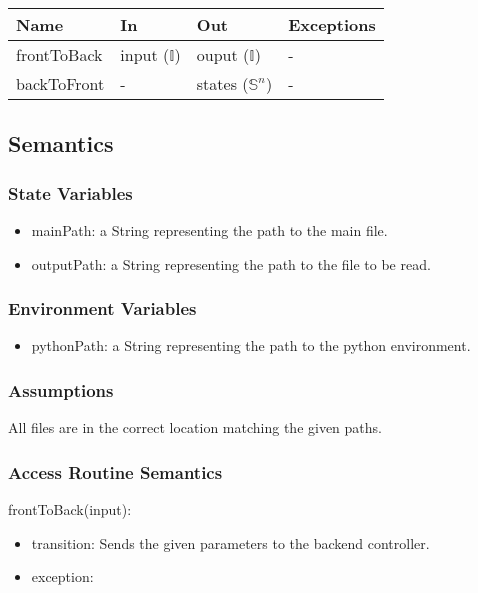 \documentclass[12pt, titlepage]{article}
\begin{document}
\begin{center}
\begin{tabular}{p{2cm} p{4cm} p{4cm} p{2cm}}
\hline
\textbf{Name} & \textbf{In} & \textbf{Out} & \textbf{Exceptions} \\
\hline
frontToBack & input ($\mathbb{I}$) & ouput ($\mathbb{I}$) & - \\
backToFront & - & states ($\mathbb{S}^n$) & - \\
\hline
\end{tabular}
\end{center}

\subsection{Semantics}

\subsubsection{State Variables}

\begin{itemize}
  \item mainPath: a String representing the path to the main file.
  \item outputPath: a String representing the path to the file to be read.
\end{itemize}

\subsubsection{Environment Variables}

\begin{itemize}
  \item pythonPath: a String representing the path to the python environment.
\end{itemize}

\subsubsection{Assumptions}

All files are in the correct location matching the given paths.

\subsubsection{Access Routine Semantics}

\noindent frontToBack(input):
\begin{itemize}
\item transition: Sends the given parameters to the backend controller.
\item exception:  
\end{itemize}
\end{document}
